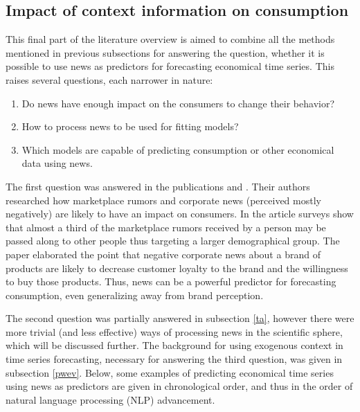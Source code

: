\documentclass[3p,times,procedia]{elsarticle}
\begin{document}
\subsection{Impact of context information on consumption} \label{icic}

This final part of the literature overview is aimed to combine all the methods mentioned in previous subsections for answering the question, whether it is possible to use news as predictors for forecasting economical time series. This raises several questions, each narrower in nature:
\begin{enumerate}
	\item Do news have enough impact on the consumers to change their behavior?
	\item How to process news to be used for fitting models?
	\item Which models are capable of predicting consumption or other economical data using news.
\end{enumerate}
The first question was answered in the publications \cite{kamins1997consumer} and \cite{sago2014impact}. Their authors researched how marketplace rumors and corporate news (perceived mostly negatively) are likely to have an impact on consumers. In the article \cite{kamins1997consumer} surveys show that almost a third of the marketplace rumors received by a person may be passed along to other people thus targeting a larger demographical group. The paper \cite{sago2014impact} elaborated the point that negative corporate news about a brand of products are likely to decrease customer loyalty to the brand and the willingness to buy those products. Thus, news can be a powerful predictor for forecasting consumption, even generalizing away from brand perception.

The second question was partially answered in subsection \ref{ta}, however there were more trivial (and less effective) ways of processing news in the scientific sphere, which will be discussed further. The background for using exogenous context in time series forecasting, necessary for answering the third question, was given in subsection \ref{pwev}. Below, some examples of predicting economical time series using news as predictors are given in chronological order, and thus in the order of natural language processing (NLP) advancement.
\end{document}
